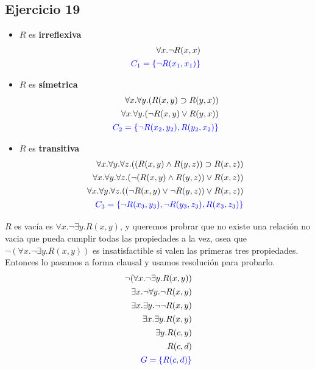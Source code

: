 \documentclass[10pt,a4paper]{article}
\begin{document}
 \subsection{Ejercicio 19}
 \begin{itemize}
 \item $R$ es \textbf{irreflexiva}
 \begin{align*}
 \forall x. \lnot R(x,x) \\[1pt]
 {\color{blue}C_1 = \{ \lnot R(x_1,x_1)\}}
 \end{align*}
 \item $R$ es \textbf{símetrica}
 \begin{align*}
 \forall x. \forall y. (R(x,y) \supset R(y,x)) \\[1pt]
 \forall x. \forall y. (\lnot R(x,y) \lor R(y,x))\\[1pt]
 {\color{blue}C_2 = \{ \lnot R(x_2,y_2), R(y_2,x_2)\} }
 \end{align*}
 \item $R$ es \textbf{transitiva}
 \begin{align*}
\forall x. \forall y. \forall z. ((R(x,y) \land R(y,z)) \supset R(x,z))\\[1pt]\forall x. \forall y. \forall z. ( \lnot (R(x,y) \land R(y,z)) \lor R(x,z))\\[1pt]
\forall x. \forall y. \forall z. ( (\lnot R(x,y) \lor \lnot R(y,z)) \lor R(x,z))\\[1pt]
{\color{blue}C_3 = \{ \lnot R(x_3,y_3), \lnot R(y_3,z_3), R(x_3,z_3)\}} \\[1pt]
 \end{align*}
\end{itemize}

$R$ es vacía es $\forall x. \lnot \exists y. R(x,y)$, y queremos probrar que no existe una relación no vacia que pueda cumplir todas las propiedades a la vez, osea que  $\lnot(\forall x. \lnot \exists y. R(x,y))$ es insatisfactible si valen las primeras tres propiedades. Entonces lo pasamos a forma clausal y usamos resolución para probarlo.
\begin{align*}
\lnot(\forall x. \lnot \exists y. R(x,y)) \\[1pt]
\exists x. \lnot \forall y. \lnot R(x,y) \\[1pt]
\exists x. \exists y. \lnot \lnot R(x,y)\\[1pt]
\exists x. \exists y. R(x,y)\\[1pt]
\exists y. R(c,y)\\[1pt]
R(c,d)\\[1pt]
{\color{blue}G = \{R(c,d)\}}\\[1pt]
\end{align*}
\end{document}
